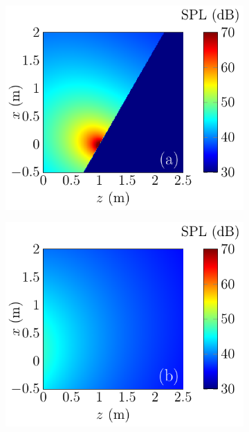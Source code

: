 \begin{figure}[!htb]
    \centering
    \begin{subfigure}{0.32\textwidth}
        \centering
        \includegraphics[width = \textwidth]{fig/ComputeCircPistonReflection_1000Hz_Incident_211013D.pdf}
    \end{subfigure}
    \begin{subfigure}{0.32\textwidth}
        \centering
        \includegraphics[width = \textwidth]{fig/ComputeCircPistonReflection_1000Hz_Reflected_211013E.pdf}

\end{subfigure}
\end{figure}
